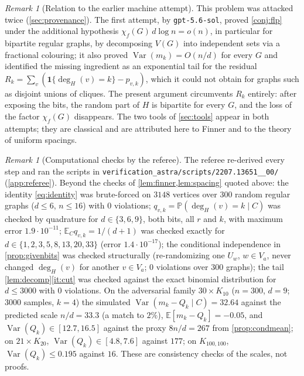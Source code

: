 \documentclass[11pt,a4paper]{article}
\theoremstyle{plain}
\theoremstyle{definition}
\theoremstyle{remark}
\newtheorem{remark}[theorem]{Remark}
\newcommand{\EE}{\mathbb E}
\newcommand{\PP}{\mathbb P}
\newcommand{\ind}{\mathbf 1}
\newcommand{\degH}{\deg_H}
\newcommand{\Var}{\operatorname{Var}}
\begin{document}
\begin{remark}[Relation to the earlier machine attempt]\label{rem:retry}
This problem was attacked twice (\cref{sec:provenance}). The first attempt, by \texttt{gpt-5.6-sol}, proved \cref{conj:flp} under the additional hypothesis $\chi_f(G)\,d\log n=o(n)$, in particular for bipartite regular graphs, by decomposing $V(G)$ into independent sets via a fractional colouring; it also proved $\Var(m_k)=O(n/d)$ for every $G$ and identified the missing ingredient as an exponential tail for the residual $R_k=\sum_v(\ind\{\degH(v)=k\}-p_{v,k})$, which it could not obtain for graphs such as disjoint unions of cliques. The present argument circumvents $R_k$ entirely: after exposing the bits, the random part of $H$ is bipartite for every $G$, and the loss of the factor $\chi_f(G)$ disappears. The two tools of \cref{sec:tools} appear in both attempts; they are classical and are attributed here to Finner \cite{Finner92} and to the theory of uniform spacings.
\end{remark}

\begin{remark}[Computational checks by the referee]
The referee re-derived every step and ran the scripts in \texttt{verification\_astra/scripts/2207.13651\_\_00/} (\cref{app:referee}). Beyond the checks of \cref{lem:finner,lem:spacing} quoted above: the identity \eqref{eq:identity} was brute-forced on $3148$ vertices over $300$ random regular graphs ($d\le6$, $n\le16$) with $0$ violations; $q_{v,k}=\PP(\degH(v)=k\mid C)$ was checked by quadrature for $d\in\{3,6,9\}$, both bits, all $r$ and $k$, with maximum error $1.9\cdot10^{-11}$; $\EE_C q_{v,k}=1/(d+1)$ was checked exactly for $d\in\{1,2,3,5,8,13,20,33\}$ (error $1.4\cdot10^{-17}$); the conditional independence in \cref{prop:givenbits} was checked structurally (re-randomizing one $U_w$, $w\in V_a$, never changed $\degH(v)$ for another $v\in V_a$; $0$ violations over $300$ graphs); the tail \cref{lem:decomp}\ref{it:cut} was checked against the exact binomial distribution for $d\le3000$ with $0$ violations. On the adversarial family $30\times K_{10}$ ($n=300$, $d=9$; $3000$ samples, $k=4$) the simulated $\Var(m_k-Q_k\mid C)=32.64$ against the predicted scale $n/d=33.3$ (a match to $2\%$), $\EE[m_k-Q_k]=-0.05$, and $\Var(Q_k)\in[12.7,16.5]$ against the proxy $8n/d=267$ from \cref{prop:condmean}; on $21\times K_{20}$, $\Var(Q_k)\in[4.8,7.6]$ against $177$; on $K_{100,100}$, $\Var(Q_k)\le0.195$ against $16$. These are consistency checks of the scales, not proofs.
\end{remark}
\end{document}
